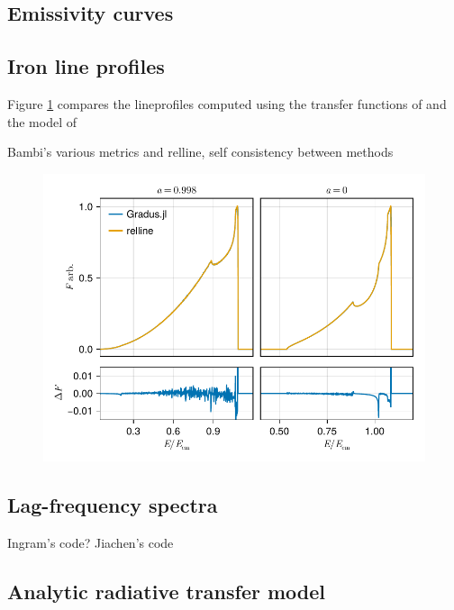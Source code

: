 \documentclass[fleqn,usenatbib]{mnras}
\begin{document}
\subsection{Emissivity curves}


\subsection{Iron line profiles}

Figure \ref{fig:relline-comparison} compares the lineprofiles computed using the transfer functions of \Gradus and the \relline model of \cite{dauser_broad_2010}

Bambi's various metrics and relline, self consistency between methods



\begin{figure}
	\centering
	\includegraphics[width=0.99\linewidth]{figures/lineprofiles.comparison.pdf}
	\caption{}
	\label{fig:relline-comparison}
\end{figure}

\subsection{Lag-frequency spectra}

Ingram's code? Jiachen's code

\subsection{Analytic radiative transfer model}
\end{document}
